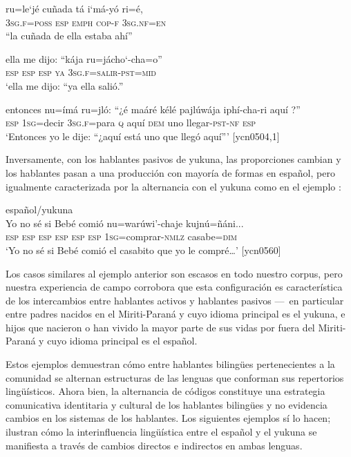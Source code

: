 \documentclass[output=paper]{langscibook}
\begin{document}
\ex
\gll ru=le‘jé   cuñada tá     i‘má-yó ri=é,\\
\textsc{3sg.f=poss}   \textsc{esp} \textsc{emph}  \textsc{cop-f}   \textsc{3sg.nf={en}}\\
\glt ``la cuñada de ella estaba ahí''

\ex
\gll ella me dijo: “kája ru=jácho‘-cha=o”\\
\textsc{esp} \textsc{esp}  \textsc{esp} \textsc{ya} \textsc{3sg.f={salir}-pst=mid}\\
\glt `ella me dijo: “ya ella salió.”

\ex
\gll entonces nu=ímá ru=jló: “¿é maáré kélé pajlúwája iphí-cha-ri aquí ?”\\
\textsc{esp} \textsc{1sg}={decir} \textsc{3sg.f}=para \textsc{q} aquí \textsc{dem} uno llegar-\textsc{pst}-\textsc{nf}   \textsc{esp}\\
\glt `Entonces yo le dije: ``¿aquí está uno que llegó aquí''{}' [ycn0504,1]
\z
\z

Inversamente, con los hablantes pasivos de yukuna, las proporciones cambian y los hablantes pasan a una producción con mayoría de formas en español, pero igualmente caracterizada por la alternancia con el yukuna como en el ejemplo :

\ea\label{ex:lemus:2}
{español/yukuna}\\
\gll Yo no sé si Bebé comió nu=warúwi’-chaje kujnú=ñáni...\\
     \textsc{esp} \textsc{esp} \textsc{esp} \textsc{esp}  \textsc{esp} \textsc{esp} \textsc{1sg=}comprar\textsc{-nmlz} casabe\textsc{=dim}\\
\glt `Yo no sé si Bebé comió el casabito que yo le compré…' [ycn0560]
\z

Los casos similares al ejemplo anterior son escasos en todo nuestro corpus, pero nuestra experiencia de campo corrobora que esta configuración es característica de los intercambios entre hablantes activos y hablantes pasivos –– en particular entre padres nacidos en el Miriti-Paraná y cuyo idioma principal es el yukuna, e hijos que nacieron o han vivido la mayor parte de sus vidas por fuera del Miriti-Paraná y cuyo idioma principal es el español.

Estos ejemplos demuestran cómo entre hablantes bilingües pertenecientes a la comunidad se alternan estructuras de las lenguas que conforman sus repertorios lingüísticos.  Ahora bien, la alternancia de códigos constituye una estrategia comunicativa identitaria y cultural de los hablantes bilingües y no evidencia cambios en los sistemas de los hablantes. Los siguientes ejemplos sí lo hacen; ilustran cómo la interinfluencia lingüística entre el español y el yukuna se manifiesta a través de cambios directos e indirectos en ambas lenguas.  
\end{document}
